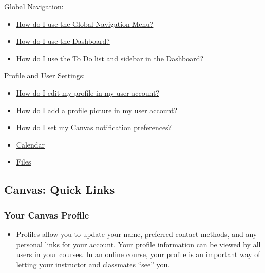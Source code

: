Global Navigation:

\begin{itemize}
\item
  \href{https://community.canvaslms.com/t5/Student-Guide/How-do-I-use-the-Global-Navigation-Menu-as-a-student/ta-p/522}{How do I use the Global Navigation Menu?}
\item
  \href{https://community.canvaslms.com/t5/Student-Guide/How-do-I-use-the-Dashboard-as-a-student/ta-p/512}{How do I use the Dashboard?}
\item
  \href{https://community.canvaslms.com/t5/Student-Guide/How-do-I-use-the-To-Do-list-and-sidebar-in-the-Dashboard-as-a/ta-p/511}{How do I use the To Do list and sidebar in the Dashboard?}
\end{itemize}

Profile and User Settings:

\begin{itemize}
\item
  \href{https://community.canvaslms.com/t5/Student-Guide/How-do-I-edit-my-profile-in-my-user-account-as-a-student/ta-p/421}{How do I edit my profile in my user account?}
\item
  \href{https://community.canvaslms.com/t5/Student-Guide/How-do-I-add-a-profile-picture-in-my-user-account-as-a-student/ta-p/518}{How do I add a profile picture in my user account?}
\item
  \href{https://community.canvaslms.com/t5/Student-Guide/How-do-I-manage-my-Canvas-notification-settings-as-a-student/ta-p/434}{How do I set my Canvas notification preferences?}
\item
  \href{https://vimeo.com/78015141}{Calendar}
\item
  \href{https://vimeo.com/74772644}{Files}
\end{itemize}

\hypertarget{canvas-quick-links}{%
\subsection{Canvas: Quick Links}\label{canvas-quick-links}}

\hypertarget{your-canvas-profile}{%
\subsubsection{Your Canvas Profile}\label{your-canvas-profile}}

\begin{itemize}
\tightlist
\item
  \href{https://community.canvaslms.com/t5/Student-Guide/How-do-I-edit-my-profile-in-my-user-account-as-a-student/ta-p/421}{Profiles} allow you to update your name, preferred contact methods, and any personal links for your account. Your profile information can be viewed by all users in your courses. In an online course, your profile is an important way of letting your instructor and classmates ``see'' you.
\end{itemize}

